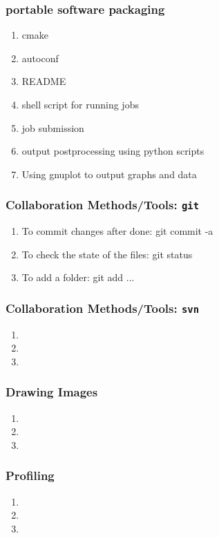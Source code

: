 \begin{frame}
\frametitle{portable software packaging} 
\begin{enumerate}
\item cmake 
\item autoconf
\item README 
\item shell script for running jobs
\item job submission
\item output postprocessing using python scripts
\item Using gnuplot to output graphs and data 
\end{enumerate}
\end{frame}

\begin{frame}
\frametitle{Collaboration Methods/Tools: \texttt{git}}
\begin{enumerate}
\item To commit changes after done: git commit -a
\item To check the state of the files:  git status
\item To add a folder: git add ... 
\end{enumerate} 
\end{frame}


\begin{frame}
\frametitle{Collaboration Methods/Tools: \texttt{svn}}
\begin{enumerate}
\item 
\item 
\item 
\end{enumerate}
\end{frame}


\begin{frame}
\frametitle{Drawing Images}
\begin{enumerate}
\item 
\item 
\item 
\end{enumerate}
\end{frame}


\begin{frame}
\frametitle{Profiling}
\begin{enumerate}
\item 
\item 
\item 
\end{enumerate}
\end{frame}


